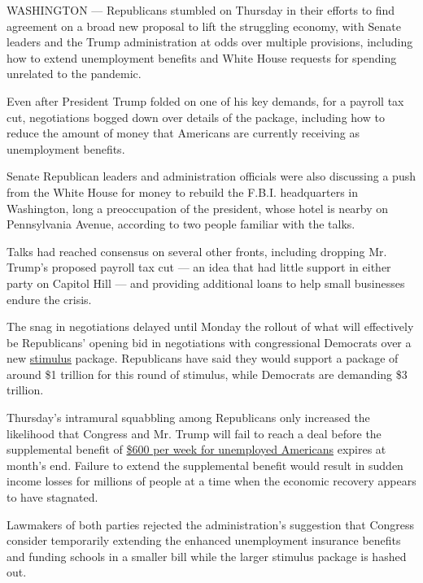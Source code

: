 WASHINGTON --- Republicans stumbled on Thursday in their efforts to find
agreement on a broad new proposal to lift the struggling economy, with
Senate leaders and the Trump administration at odds over multiple
provisions, including how to extend unemployment benefits and White
House requests for spending unrelated to the pandemic.

Even after President Trump folded on one of his key demands, for a
payroll tax cut, negotiations bogged down over details of the package,
including how to reduce the amount of money that Americans are currently
receiving as unemployment benefits.

Senate Republican leaders and administration officials were also
discussing a push from the White House for money to rebuild the F.B.I.
headquarters in Washington, long a preoccupation of the president, whose
hotel is nearby on Pennsylvania Avenue, according to two people familiar
with the talks.

Talks had reached consensus on several other fronts, including dropping
Mr. Trump's proposed payroll tax cut --- an idea that had little support
in either party on Capitol Hill --- and providing additional loans to
help small businesses endure the crisis.

The snag in negotiations delayed until Monday the rollout of what will
effectively be Republicans' opening bid in negotiations with
congressional Democrats over a new
\href{https://www.nytimes3xbfgragh.onion/interactive/2020/07/24/business/economy/600-unemployment-benefits.html}{stimulus}
package. Republicans have said they would support a package of around
\$1 trillion for this round of stimulus, while Democrats are demanding
\$3 trillion.

Thursday's intramural squabbling among Republicans only increased the
likelihood that Congress and Mr. Trump will fail to reach a deal before
the supplemental benefit of
\href{https://www.nytimes3xbfgragh.onion/2020/07/30/business/unemployment-payments-change.html}{\$600
per week for unemployed Americans} expires at month's end. Failure to
extend the supplemental benefit would result in sudden income losses for
millions of people at a time when the economic recovery appears to have
stagnated.

Lawmakers of both parties rejected the administration's suggestion that
Congress consider temporarily extending the enhanced unemployment
insurance benefits and funding schools in a smaller bill while the
larger stimulus package is hashed out.


